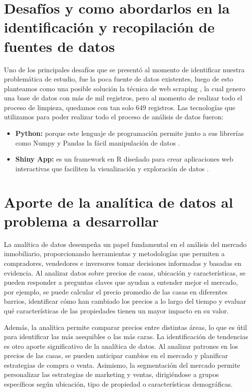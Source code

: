 \documentclass[12pt,a4paper]{article}
\begin{document}
\section{Desafíos y como abordarlos en la identificación y recopilación de fuentes de datos}
Uno de los principales desafíos que se presentó al momento de identificar nuestra problemática de estudio, fue la poca fuente de datos existentes, luego de esto planteamos como una posible solución la técnica de web scraping , la cual genero una base de datos con más de mil registros, pero al momento de realizar todo el proceso de limpieza, quedamos con tan solo 649 registros. 
Las tecnologías que utilizamos para poder realizar todo el proceso de análisis de datos fueron:
\begin{itemize}
	\item [] \textbf{Python:} porque este lenguaje de programación permite junto a sus librerías como  Numpy y Pandas la fácil manipulación de datos \citep{python}.
	\item [] \textbf{Shiny App:} es un framework en R diseñado para crear aplicaciones web interactivas que faciliten la visualización y exploración de datos \citep{shinyapp}.
\end{itemize} 

\section{Aporte de la analítica de datos al problema a desarrollar}
La analítica de datos desempeña un papel fundamental en el análisis del mercado inmobiliario, proporcionando herramientas y metodologías que permiten a compradores, vendedores e inversores tomar decisiones informadas y basadas en evidencia. Al analizar datos sobre precios de casas, ubicación y características, se pueden responder a preguntas claves que ayudan a entender mejor el mercado, por ejemplo, se puede calcular el precio promedio de las casas en diferentes barrios, identificar cómo han cambiado los precios a lo largo del tiempo y evaluar qué características de las propiedades tienen un mayor impacto en su valor.

Además, la analítica permite comparar precios entre distintas áreas, lo que es útil para identificar las más asequibles o las más caras. La identificación de tendencias es otro aporte significativo de la analítica de datos. Al analizar patrones en los precios de las casas, se pueden anticipar cambios en el mercado y planificar estrategias de compra o venta. Asimismo, la segmentación del mercado permite personalizar las estrategias de marketing y ventas, dirigiéndose a grupos específicos según ubicación, tipo de propiedad o características demográficas.
\end{document}
